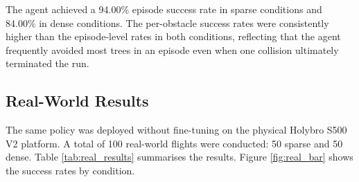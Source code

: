 \documentclass[../main.tex]{subfiles}
\begin{document}
The agent achieved a 94.00\% episode success rate in sparse conditions and 84.00\% in dense conditions. The per-obstacle success rates were consistently higher than the episode-level rates in both conditions, reflecting that the agent frequently avoided most trees in an episode even when one collision ultimately terminated the run.

\subsection{Real-World Results}

The same policy was deployed without fine-tuning on the physical Holybro S500 V2 platform. A total of 100 real-world flights were conducted: 50 sparse and 50 dense. Table \ref{tab:real_results} summarises the results. Figure \ref{fig:real_bar} shows the success rates by condition.

\vspace{6pt}
\begin{table}[H]
\centering
\caption{Real-world flight results across density conditions.}
\label{tab:real_results}
\end{table}
\end{document}
